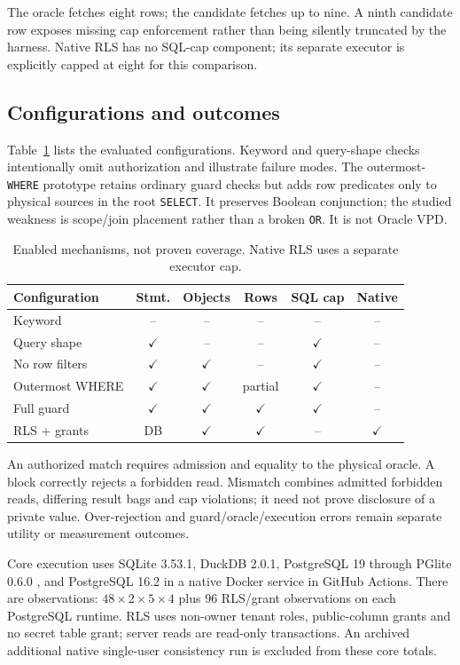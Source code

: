 \documentclass[sigconf,nonacm,natbib=false]{acmart}
\begin{document}
The oracle fetches eight rows; the candidate fetches up to nine. A ninth
candidate row exposes missing cap enforcement rather than being silently
truncated by the harness. Native RLS has no SQL-cap component; its separate
executor is explicitly capped at eight for this comparison.

\subsection{Configurations and outcomes}
Table~\ref{tab:capabilities} lists the evaluated configurations. Keyword and
query-shape checks intentionally omit authorization and illustrate failure
modes. The outermost-\texttt{WHERE} prototype retains ordinary guard checks
but adds row predicates only to physical sources in the root
\texttt{SELECT}. It preserves Boolean conjunction; the studied weakness is
scope/join placement rather than a broken \texttt{OR}. It is not Oracle VPD.

\begin{table}[t]
\centering\scriptsize
\caption{Enabled mechanisms, not proven coverage. Native RLS uses a separate executor cap.}
\label{tab:capabilities}
\begin{tabular}{lccccc}
\toprule
Configuration & Stmt. & Objects & Rows & SQL cap & Native\\
\midrule
Keyword & -- & -- & -- & -- & --\\
Query shape & $\checkmark$ & -- & -- & $\checkmark$ & --\\
No row filters & $\checkmark$ & $\checkmark$ & -- & $\checkmark$ & --\\
Outermost WHERE & $\checkmark$ & $\checkmark$ & partial & $\checkmark$ & --\\
Full guard & $\checkmark$ & $\checkmark$ & $\checkmark$ & $\checkmark$ & --\\
RLS + grants & DB & $\checkmark$ & $\checkmark$ & -- & $\checkmark$\\
\bottomrule
\end{tabular}
\end{table}

An authorized match requires admission and equality to the physical oracle.
A block correctly rejects a forbidden read. Mismatch combines admitted
forbidden reads, differing result bags and cap violations; it need not prove
disclosure of a private value. Over-rejection and guard/oracle/execution
errors remain separate utility or measurement outcomes.

Core execution uses SQLite 3.53.1, DuckDB 2.0.1, PostgreSQL 19 through
PGlite 0.6.0 \cite{pglite}, and PostgreSQL 16.2 in a native Docker service
in GitHub Actions. There are \OriginalObservations{} observations:
$48\times2\times5\times4$ plus 96 RLS/grant observations on each PostgreSQL
runtime. RLS uses non-owner tenant roles, public-column grants and no secret
table grant; server reads are read-only transactions. An archived additional
native single-user consistency run \cite{postgressingle} is excluded from these core totals.
\end{document}
